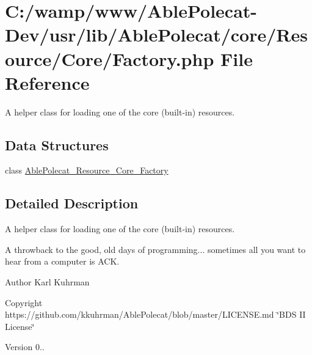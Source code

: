 \hypertarget{_factory_8php}{}\section{C\+:/wamp/www/\+Able\+Polecat-\/\+Dev/usr/lib/\+Able\+Polecat/core/\+Resource/\+Core/\+Factory.php File Reference}
\label{_factory_8php}


A helper class for loading one of the core (built-\/in) resources.  


\subsection*{Data Structures}
\begin{DoxyCompactItemize}
\item 
class \hyperlink{class_able_polecat___resource___core___factory}{Able\+Polecat\+\_\+\+Resource\+\_\+\+Core\+\_\+\+Factory}
\end{DoxyCompactItemize}


\subsection{Detailed Description}
A helper class for loading one of the core (built-\/in) resources. 

A throwback to the good, old days of programming... sometimes all you want to hear from a computer is A\+C\+K.

\begin{DoxyAuthor}{Author}
Karl Kuhrman 
\end{DoxyAuthor}
\begin{DoxyCopyright}{Copyright}
https\+://github.com/kkuhrman/\+Able\+Polecat/blob/master/\+L\+I\+C\+E\+N\+S\+E.\+md \char`\"{}\+B\+D\+S I\+I License\char`\"{} 
\end{DoxyCopyright}
\begin{DoxyVersion}{Version}
0.. 
\end{DoxyVersion}
